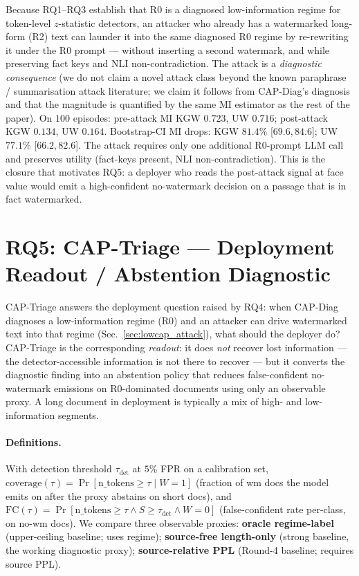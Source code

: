 \documentclass[11pt]{article}
\begin{document}
Because RQ1--RQ3 establish that R0 is a diagnosed low-information regime
for token-level $z$-statistic detectors, an attacker who already has a
watermarked long-form (R2) text can launder it into the same diagnosed
R0 regime by re-rewriting it under the R0 prompt --- without inserting a
second watermark, and while preserving fact keys and NLI
non-contradiction. The attack is a \emph{diagnostic consequence} (we do
not claim a novel attack class beyond the known paraphrase / summarisation
attack literature; we claim it follows from CAP-Diag's diagnosis and that
the magnitude is quantified by the same MI estimator as the rest of the
paper). On $100$ episodes:
pre-attack MI KGW $0.723$, UW $0.716$;
post-attack KGW $0.134$, UW $0.164$.
Bootstrap-CI MI drops: KGW $81.4\%$ [$69.6, 84.6$]; UW $77.1\%$
[$66.2, 82.6$]. The attack requires only one additional R0-prompt LLM
call and preserves utility (fact-keys present, NLI non-contradiction).
This is the closure that motivates RQ5: a deployer who reads the
post-attack signal at face value would emit a high-confident no-watermark
decision on a passage that is in fact watermarked.

\section{RQ5: CAP-Triage --- Deployment Readout / Abstention Diagnostic}
\label{sec:cap_triage}
\label{sec:triage}

CAP-Triage answers the deployment question raised by RQ4: when CAP-Diag
diagnoses a low-information regime (R0) and an attacker can drive
watermarked text into that regime (Sec.~\ref{sec:lowcap_attack}), what
should the deployer do? CAP-Triage is the corresponding \emph{readout}:
it does \emph{not} recover lost information --- the detector-accessible
information is not there to recover --- but it converts the diagnostic
finding into an abstention policy that reduces false-confident
no-watermark emissions on R0-dominated documents using only an observable
proxy. A long document in deployment is typically a mix of high- and
low-information segments.

\paragraph{Definitions.}
With detection threshold $\tau_{\text{det}}$ at $5\%$ FPR on a calibration
set, $\text{coverage}(\tau)\!=\!\Pr[\text{n\_tokens}\!\geq\!\tau \mid W{=}1]$
(fraction of wm docs the model emits on after the proxy abstains on short
docs), and $\text{FC}(\tau)\!=\!\Pr[\text{n\_tokens}\!\geq\!\tau \wedge S\!\geq\!\tau_{\text{det}} \wedge W{=}0]$
(false-confident rate per-class, on no-wm docs).
We compare three observable proxies: \textbf{oracle regime-label}
(upper-ceiling baseline; uses regime); \textbf{source-free length-only}
(strong baseline, the working diagnostic proxy); \textbf{source-relative PPL}
(Round-4 baseline; requires source PPL).
\end{document}
